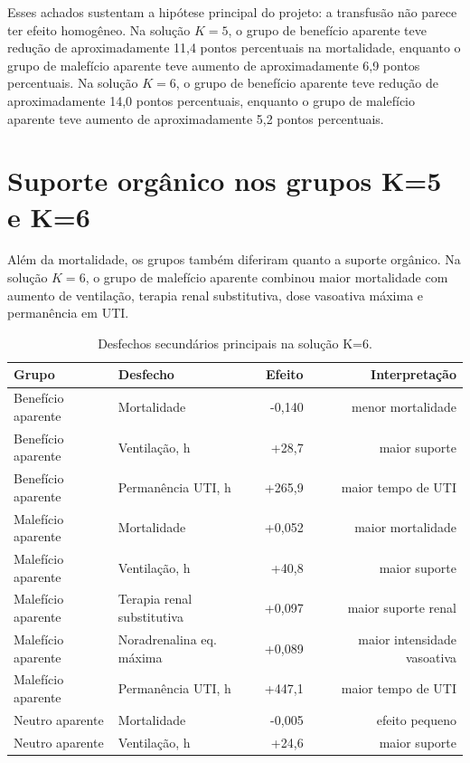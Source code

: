 \documentclass[12pt,a4paper]{article}
\begin{document}
Esses achados sustentam a hip\'otese principal do projeto: a transfus\~ao n\~ao parece ter efeito homog\^eneo. Na solu\c{c}\~ao $K=5$, o grupo de benef\'icio aparente teve redu\c{c}\~ao de aproximadamente 11,4 pontos percentuais na mortalidade, enquanto o grupo de malef\'icio aparente teve aumento de aproximadamente 6,9 pontos percentuais. Na solu\c{c}\~ao $K=6$, o grupo de benef\'icio aparente teve redu\c{c}\~ao de aproximadamente 14,0 pontos percentuais, enquanto o grupo de malef\'icio aparente teve aumento de aproximadamente 5,2 pontos percentuais.

\section{Suporte org\^anico nos grupos K=5 e K=6}

Al\'em da mortalidade, os grupos tamb\'em diferiram quanto a suporte org\^anico. Na solu\c{c}\~ao $K=6$, o grupo de malef\'icio aparente combinou maior mortalidade com aumento de ventila\c{c}\~ao, terapia renal substitutiva, dose vasoativa m\'axima e perman\^encia em UTI.

\begin{table}[ht]
\centering
\caption{Desfechos secund\'arios principais na solu\c{c}\~ao K=6.}
\begin{tabular}{llrr}
\toprule
Grupo & Desfecho & Efeito & Interpreta\c{c}\~ao \\
\midrule
Benef\'icio aparente & Mortalidade & -0,140 & menor mortalidade \\
Benef\'icio aparente & Ventila\c{c}\~ao, h & +28,7 & maior suporte \\
Benef\'icio aparente & Perman\^encia UTI, h & +265,9 & maior tempo de UTI \\
\midrule
Malef\'icio aparente & Mortalidade & +0,052 & maior mortalidade \\
Malef\'icio aparente & Ventila\c{c}\~ao, h & +40,8 & maior suporte \\
Malef\'icio aparente & Terapia renal substitutiva & +0,097 & maior suporte renal \\
Malef\'icio aparente & Noradrenalina eq. m\'axima & +0,089 & maior intensidade vasoativa \\
Malef\'icio aparente & Perman\^encia UTI, h & +447,1 & maior tempo de UTI \\
\midrule
Neutro aparente & Mortalidade & -0,005 & efeito pequeno \\
Neutro aparente & Ventila\c{c}\~ao, h & +24,6 & maior suporte \\
\bottomrule
\end{tabular}
\end{table}
\end{document}
